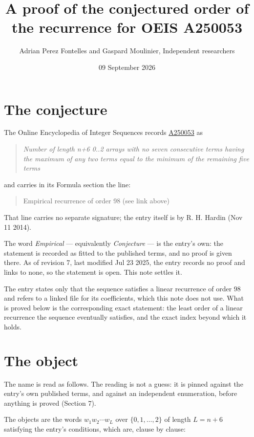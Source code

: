\documentclass[11pt]{article}
\title{A proof of the conjectured order of the recurrence for OEIS A250053}
\author{Adrian Perez Fontelles and Gaspard Moulinier, Independent researchers}
\date{09 September 2026}
\theoremstyle{definition}
\begin{document}
\maketitle
\section{The conjecture}

The Online Encyclopedia of Integer Sequences records \href{https://oeis.org/A250053}{A250053} as

\begin{quote}\itshape Number of length n+6 0..2 arrays with no seven consecutive terms having the maximum of any two terms equal to the minimum of the remaining five terms\end{quote}

and carries in its Formula section the line:

\begin{quote}\ttfamily Empirical recurrence of order 98 (see link above)\end{quote}

That line carries no separate signature; the entry itself is by R. H. Hardin (Nov 11 2014).

The word {\itshape Empirical} --- equivalently {\itshape Conjecture} --- is the entry's own: the statement is recorded as fitted to the published terms, and no proof is given there. As of revision 7, last modified Jul 23 2025, the entry records no proof and links to none, so the statement is open. This note settles it.

The entry states only that the sequence satisfies a linear recurrence of order $98$ and refers to a linked file for its coefficients, which this note does not use. What is proved below is the corresponding exact statement: the least order of a linear recurrence the sequence eventually satisfies, and the exact index beyond which it holds.

\section{The object}

The name is read as follows. The reading is not a guess: it is pinned against the entry's own published terms, and against an independent enumeration, before anything is proved (Section 7).

The objects are the words $w_1 w_2 \cdots w_L$ over $\{0,1,\dots,2\}$ of length $L = n + 6$ satisfying the entry's conditions, which are, clause by clause:
\end{document}
